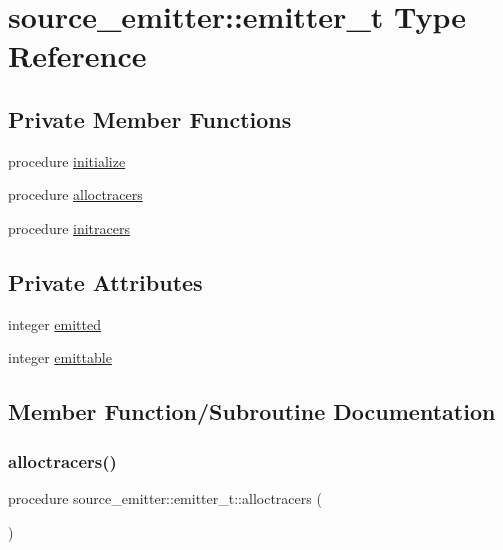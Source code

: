 \hypertarget{structsource__emitter_1_1emitter__t}{}\section{source\+\_\+emitter\+:\+:emitter\+\_\+t Type Reference}
\label{structsource__emitter_1_1emitter__t}
\subsection*{Private Member Functions}
\begin{DoxyCompactItemize}
\item 
procedure \hyperlink{structsource__emitter_1_1emitter__t_aed2db993a937e50d5252b41cefcf6e35}{initialize}
\item 
procedure \hyperlink{structsource__emitter_1_1emitter__t_a30562aff6a891e4e2d4836ba833e5b55}{alloctracers}
\item 
procedure \hyperlink{structsource__emitter_1_1emitter__t_ad016a19c24542b2cd39cba9436902305}{initracers}
\end{DoxyCompactItemize}
\subsection*{Private Attributes}
\begin{DoxyCompactItemize}
\item 
integer \hyperlink{structsource__emitter_1_1emitter__t_a30062afe1a31dcfd77c90762d8c8cb5c}{emitted}
\item 
integer \hyperlink{structsource__emitter_1_1emitter__t_acfae676591a37474f44f9c49c1079c98}{emittable}
\end{DoxyCompactItemize}


\subsection{Member Function/\+Subroutine Documentation}
\mbox{\label{structsource__emitter_1_1emitter__t_a30562aff6a891e4e2d4836ba833e5b55}} 
\subsubsection{\texorpdfstring{alloctracers()}{alloctracers()}}
{\footnotesize\ttfamily procedure source\+\_\+emitter\+::emitter\+\_\+t\+::alloctracers (\begin{DoxyParamCaption}{ }\end{DoxyParamCaption})\hspace{0.3cm}{\ttfamily [private]}}

